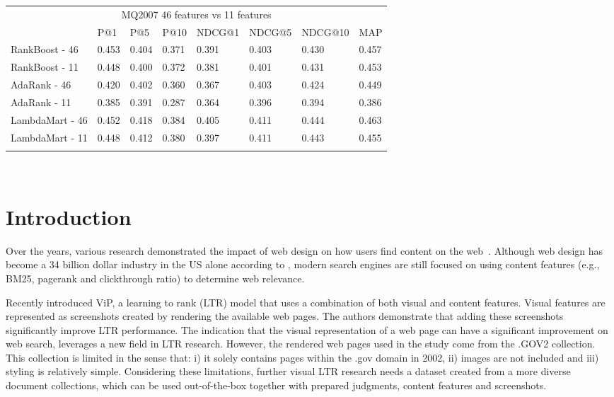 
\begin{table}[t]
\begin{center}
\begin{tabular}{llllllll}
\multicolumn{8}{c}{MQ2007 46 features vs 11 features}                                     \\
           & P@1    & P@5    & P@10   & NDCG@1 & NDCG@5 & NDCG@10 & MAP    \\ \hline
RankBoost - 46  & 0.453 & 0.404 & 0.371 & 0.391 & 0.403 & 0.430  & 0.457 \\
RankBoost - 11 & 0.448 & 0.400 & 0.372 & 0.381  & 0.401  & 0.431   & 0.453 \\ \hline
AdaRank - 46  & 0.420 & 0.402 & 0.360 & 0.367 & 0.403 & 0.424  & 0.449 \\
AdaRank - 11  & 0.385 & 0.391 & 0.287 & 0.364  & 0.396  & 0.394   & 0.386 \\ \hline
LambdaMart - 46 & 0.452 & 0.418 & 0.384 & 0.405 & 0.411 & 0.444  & 0.463 \\
LambdaMart - 11 & 0.448 & 0.412 & 0.380 & 0.397  & 0.411  & 0.443   & 0.455 \\
\hline
\\
\end{tabular}
\\
\label{tab:11vs46}
\end{center}
\end{table}



\section{Introduction}
Over the years, various research demonstrated the impact of web design on how users find content on the web~\cite{nielsen1999designing,nielsen2006f,pernice2017f,wang2014eye}.  Although web design has become a 34 billion dollar industry in the US alone according to \citet{ibisdesign}, modern search engines are still focused on using content features (e.g., BM25, pagerank and clickthrough ratio) to determine web relevance. 

Recently \citet{fan2017learning} introduced ViP, a learning to rank (LTR) model that uses a combination of both visual and content features. Visual features are represented as screenshots created by rendering the available web pages. The authors demonstrate that adding these screenshots significantly improve LTR performance. The indication that the visual representation of a web page can have a significant improvement on web search, leverages a new field in LTR research. 
However, the rendered web pages used in the study come from the .GOV2 collection. This collection is limited in the sense that: i) it solely contains pages within the .gov domain in 2002, ii) images are not included and iii) styling is relatively simple. Considering these limitations, further visual LTR research needs a dataset created from a more diverse document collections, which can be used out-of-the-box together with prepared judgments, content features and screenshots. 

